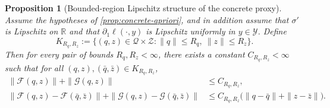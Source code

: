 \documentclass{article}
\newtheorem{proposition}[theorem]{Proposition}
\theoremstyle{definition}
\newcommand{\R}{\mathbb{R}}
\begin{document}
\begin{proposition}[Bounded-region Lipschitz structure of the concrete proxy]
\label{prop:moment-local}
Assume the hypotheses of \cref{prop:concrete-apriori}, and in addition assume that $\sigma'$ is Lipschitz on $\R$ and that $\partial_1\ell(\cdot,y)$ is Lipschitz uniformly in $y\in\mathcal Y$. Define
\[
  K_{R_q,R_z}
  :=
  \bigl\{
    (q,z)\in\mathcal Q\times\mathcal Z:
    \|q\|\le R_q,\ \|z\|\le R_z
  \bigr\}.
\]
Then for every pair of bounds $R_q,R_z<\infty$, there exists a constant $C_{R_q,R_z}<\infty$ such that for all $(q,z),(\bar q,\bar z)\in K_{R_q,R_z}$,
\begin{align}
  \|\mathcal F(q,z)\|+\|\mathcal G(q,z)\|
  &\le
  C_{R_q,R_z},
  \label{eq:concrete-local-bdd}
  \\
  \|\mathcal F(q,z)-\mathcal F(\bar q,\bar z)\|
  +
  \|\mathcal G(q,z)-\mathcal G(\bar q,\bar z)\|
  &\le
  C_{R_q,R_z}
  \bigl(
    \|q-\bar q\|+\|z-\bar z\|
  \bigr).
  \label{eq:concrete-local-lip}
\end{align}
\end{proposition}
\end{document}
